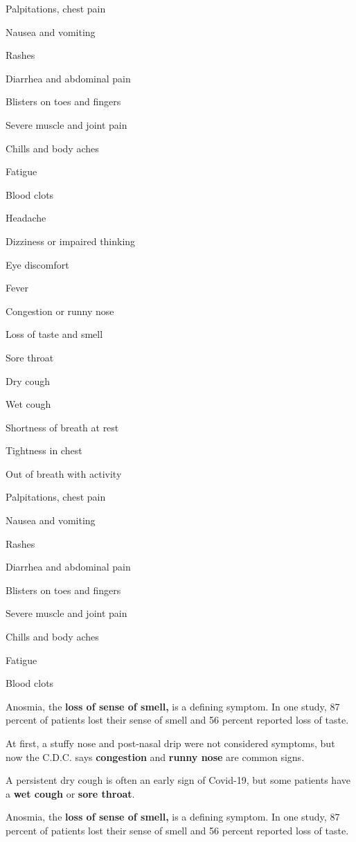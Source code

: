 Palpitations, chest pain

Nausea and vomiting

Rashes

Diarrhea and abdominal pain

Blisters on toes and fingers

Severe muscle and joint pain

Chills and body aches

Fatigue

Blood clots

Headache

Dizziness or impaired thinking

Eye discomfort

Fever

Congestion or runny nose

Loss of taste and smell

Sore throat

Dry cough

Wet cough

Shortness of breath at rest

Tightness in chest

Out of breath with activity

Palpitations, chest pain

Nausea and vomiting

Rashes

Diarrhea and abdominal pain

Blisters on toes and fingers

Severe muscle and joint pain

Chills and body aches

Fatigue

Blood clots

Anosmia, the \textbf{loss of sense of smell,} is a defining symptom. In
one study, 87 percent of patients lost their sense of smell and 56
percent reported loss of taste.

At first, a stuffy nose and post-nasal drip were not considered
symptoms, but now the C.D.C. says \textbf{congestion} and \textbf{runny
nose} are common signs.

A persistent dry cough is often an early sign of Covid-19, but some
patients have a \textbf{wet cough} or \textbf{sore throat}.

Anosmia, the \textbf{loss of sense of smell,} is a defining symptom. In
one study, 87 percent of patients lost their sense of smell and 56
percent reported loss of taste.

